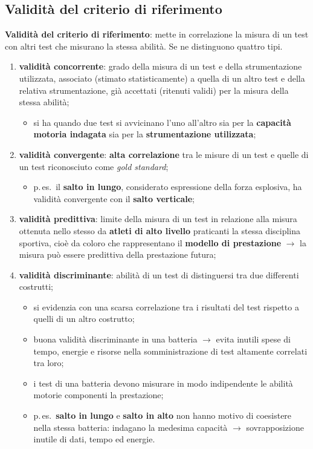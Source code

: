 \subsection{Validità del criterio di riferimento}

\textbf{Validità del criterio di riferimento}: mette in correlazione la misura di un test con
altri test che misurano la stessa abilità. Se ne distinguono quattro tipi.

\begin{enumerate}
  \item \textbf{validità concorrente}: grado della misura di un test e della strumentazione
    utilizzata, associato (stimato statisticamente) a quella di un altro test e della relativa
    strumentazione, già accettati (ritenuti validi) per la misura della stessa abilità;
    \begin{itemize}
      \item si ha quando due test si avvicinano l'uno all'altro sia per la \textbf{capacità motoria
        indagata} sia per la \textbf{strumentazione utilizzata};
    \end{itemize}
  \item \textbf{validità convergente}: \textbf{alta correlazione} tra le misure di un test e quelle
    di un test riconosciuto come \textit{gold standard};
    \begin{itemize}
      \item p.\,es.\ il \textbf{salto in lungo}, considerato espressione della forza esplosiva, ha
        validità convergente con il \textbf{salto verticale};
    \end{itemize}
  \item \textbf{validità predittiva}: limite della misura di un test in relazione alla misura
    ottenuta nello stesso da \textbf{atleti di alto livello} praticanti la stessa disciplina
    sportiva, cioè da coloro che rappresentano il \textbf{modello di prestazione} $\rightarrow$ la
    misura può essere predittiva della prestazione futura;
  \item \textbf{validità discriminante}: abilità di un test di distinguersi tra due differenti
    costrutti;
    \begin{itemize}
      \item si evidenzia con una scarsa correlazione tra i risultati del test rispetto a quelli
        di un altro costrutto;
      \item buona validità discriminante in una batteria $\rightarrow$ evita inutili spese di
        tempo, energie e risorse nella somministrazione di test altamente correlati tra loro;
      \item i test di una batteria devono misurare in modo indipendente le abilità motorie
        componenti la prestazione;
      \item p.\,es.\ \textbf{salto in lungo} e \textbf{salto in alto} non hanno motivo di coesistere
        nella stessa batteria: indagano la medesima capacità $\rightarrow$ sovrapposizione inutile
        di dati, tempo ed energie.
    \end{itemize}
\end{enumerate}

